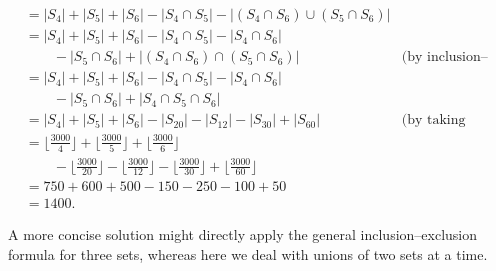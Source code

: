 \documentclass[12pt]{article}
\begin{document}
\begin{problem}{15}
{\begin{align*}
                &= |S_4| + |S_5| + |S_6| - |S_4 \cap S_5| - |(S_4 \cap S_6) \cup (S_5 \cap S_6)| \\
                &= |S_4| + |S_5| + |S_6| - |S_4 \cap S_5| - |S_4 \cap S_6| \\
                &\qquad - |S_5 \cap S_6| + |(S_4 \cap S_6) \cap (S_5 \cap S_6)| & \text{(by inclusion--exclusion)} \\
                &= |S_4| + |S_5| + |S_6| - |S_4 \cap S_5| - |S_4 \cap S_6| \\
                &\qquad - |S_5 \cap S_6| + |S_4 \cap S_5 \cap S_6| \\
                &= |S_4| + |S_5| + |S_6| - |S_{20}| - |S_{12}| - |S_{30}| + |S_{60}| & \text{(by taking LCMs)} \\
                &= \lfloor \frac{3000}{4} \rfloor + \lfloor \frac{3000}{5} \rfloor + \lfloor \frac{3000}{6} \rfloor \\
                &\qquad - \lfloor \frac{3000}{20} \rfloor - \lfloor \frac{3000}{12} \rfloor - \lfloor \frac{3000}{30} \rfloor + \lfloor \frac{3000}{60} \rfloor \\
                &= 750 + 600 + 500 - 150 - 250 - 100 + 50 \\
                &= 1400.
        \end{align*}

        A more concise solution might directly apply the general inclusion--exclusion formula for three sets, whereas here we deal with unions of two sets at a time.
    }

\end{problem}
\newpage




%
%
%
\end{document}
